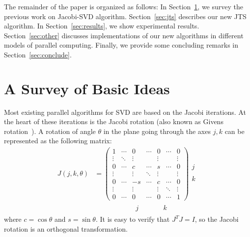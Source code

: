 \documentclass[10pt, conference, compsocconf]{IEEEtran}
\begin{document}
The remainder of the paper is organized as follows: In Section~\ref{sec:prevwork}, we survey the previous work on Jacobi-SVD algorithm.  Section~\ref{sec:jts} describes our new JTS algorithm. In Section~\ref{sec:results}, we show experimental results. Section~\ref{sec:other} discusses implementations of our new algorithms in different models of parallel computing. Finally, we provide some concluding remarks in Section~\ref{sec:conclude}.


\section{A Survey of Basic Ideas}
\label{sec:prevwork}

Most existing parallel algorithms for SVD are based on the Jacobi iterations. At the heart of these iterations is the Jacobi rotation (also known as Givens rotation~\cite{golub2012matrix}). A rotation of angle $\theta$ in the plane going through the axes $j,k$ can be represented as the following matrix:
\begin{align}
  J(j,k,\theta) &= \left( \begin{array}{ccccccc} 
  1 & \cdots & 0 & \cdots & 0 & \cdots & 0 \\
  \vdots & \ddots & \vdots & & \vdots & & \vdots \\
  0 & \cdots & c & \cdots & s & \cdots & 0 \\
  \vdots & & \vdots & \ddots  & \vdots & & \vdots \\
  0 & \cdots & -s & \cdots & c & \cdots & 0 \\
  \vdots & & \vdots & & \vdots  & \ddots  & \vdots \\
  0 & \cdots & 0 & \cdots & 0 & \cdots & 1
\end{array} \right)
\begin{array}{l}
  \\
  j \\
  \\
  k
  \\
  \\
\end{array} \\
& \begin{array}{ccccccc}
 \qquad &\qquad & j & \qquad & k & &
\end{array} \label{eq:rotation}
\end{align}
where $c=\cos \theta$ and $s=\sin \theta$. It is easy to verify that $J^T J = I$, so the Jacobi rotation is an orthogonal transformation.
\end{document}
